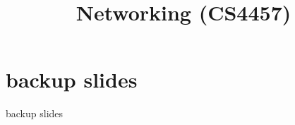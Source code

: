 \date{}
\title{Networking (CS4457)}
\date{}

\begin{frame}
    \titlepage
\end{frame}










\section{backup slides}
\begin{frame}{backup slides}
\end{frame}


